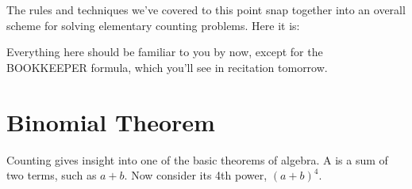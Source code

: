 The rules and techniques we've covered to this point snap together
into an overall scheme for solving elementary counting problems.  Here
it is:


Everything here should be familiar to you by now, except for the
BOOKKEEPER formula, which you'll see in recitation tomorrow.
\fi

\section{Binomial Theorem}\label{binomial_theorem_sec}

Counting gives insight into one of the basic theorems of algebra.  A
 is a sum of two terms, such as $a + b$.  Now consider its
4th power, $(a + b)^4$.

